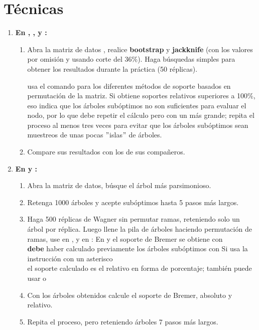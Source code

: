 

\section*{T\'ecnicas}

\begin{enumerate}
\item \textbf{En , ,  y :}
	\begin{enumerate}
		\item   Abra la matriz de datos , realice \textbf{bootstrap} y \textbf{jackknife} (con los valores por omisi\'on y usando corte del 36\%). Haga b\'usquedas simples para obtener los resultados durante la pr\'actica (50 r\'eplicas). 

		 usa el comando  para los diferentes m\'etodos de soporte basados en permutaci\'on de la matriz. Si obtiene soportes relativos superiores a 100\%, eso indica que los \'arboles sub\'optimos no son suficientes para evaluar el nodo, por lo que debe repetir el c\'alculo pero con un  m\'as grande; repita el proceso al menos tres veces para evitar que los \'arboles sub\'optimos sean muestreos de unas pocas $"$islas$"$ de \'arboles.

		\item Compare sus resultados con los de sus compa\~neros. 
	\end{enumerate}

\item \textbf{En  y :}
	\begin{enumerate}
		\item  Abra la matriz de datos, b\'usque el \'arbol m\'as parsimonioso.\\
		\item Retenga 1000 \'arboles y acepte sub\'optimos hasta  5 pasos m\'as largos. 
		\item Haga 500 r\'eplicas de Wagner sin permutar ramas, reteniendo solo un \'arbol por r\'eplica. Luego llene la pila de \'arboles haciendo permutaci\'on de ramas, use  en , y en : 
		En  y  el soporte de Bremer se obtiene con \\
		\textbf{debe} haber calculado previamente los \'arboles  sub\'optimos con 
		Si usa la instrucci\'on con un asterisco \\
		el soporte calculado es el relativo en forma de porcentaje; tambi\'en puede usar \cmd{bsupport [;} o \cmd{bsupport ];}
		\item Con los \'arboles obtenidos calcule el soporte de Bremer, absoluto y relativo.\\
		\item Repita el proceso, pero reteniendo \'arboles 7 pasos m\'as largos.\\
	\end{enumerate}


\end{enumerate}
